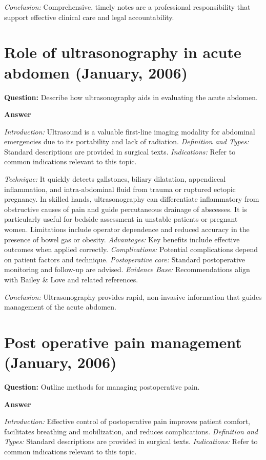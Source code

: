 \documentclass{article}
\begin{document}
\emph{Conclusion:} Comprehensive, timely notes are a professional responsibility that support effective clinical care and legal accountability.


\section{Role of ultrasonography in acute abdomen (January, 2006)}

\textbf{Question:} Describe how ultrasonography aids in evaluating the acute abdomen.

\textbf{Answer}

\emph{Introduction:} Ultrasound is a valuable first-line imaging modality for abdominal emergencies due to its portability and lack of radiation.
\emph{Definition and Types:} Standard descriptions are provided in surgical texts.
\emph{Indications:} Refer to common indications relevant to this topic.

\emph{Technique:} It quickly detects gallstones, biliary dilatation, appendiceal inflammation, and intra-abdominal fluid from trauma or ruptured ectopic pregnancy. In skilled hands, ultrasonography can differentiate inflammatory from obstructive causes of pain and guide percutaneous drainage of abscesses. It is particularly useful for bedside assessment in unstable patients or pregnant women. Limitations include operator dependence and reduced accuracy in the presence of bowel gas or obesity.
\emph{Advantages:} Key benefits include effective outcomes when applied correctly.
\emph{Complications:} Potential complications depend on patient factors and technique.
\emph{Postoperative care:} Standard postoperative monitoring and follow-up are advised.
\emph{Evidence Base:} Recommendations align with Bailey & Love and related references.

\emph{Conclusion:} Ultrasonography provides rapid, non-invasive information that guides management of the acute abdomen.


\section{Post operative pain management (January, 2006)}

\textbf{Question:} Outline methods for managing postoperative pain.

\textbf{Answer}

\emph{Introduction:} Effective control of postoperative pain improves patient comfort, facilitates breathing and mobilization, and reduces complications.
\emph{Definition and Types:} Standard descriptions are provided in surgical texts.
\emph{Indications:} Refer to common indications relevant to this topic.
\end{document}

